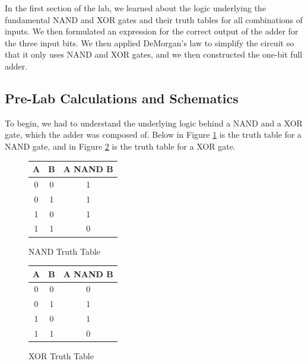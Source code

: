 \documentclass[10pt]{article}
\begin{document}
In the first section of the lab, we learned about the logic underlying the fundamental NAND and XOR gates and their truth tables for all combinations of inputs. We then formulated an expression for the correct output of the adder for the three input bits. We then applied DeMorgan's law to simplify the circuit so that it only uses NAND and XOR gates, and we then constructed the one-bit full adder. 

\medskip


\subsection{Pre-Lab Calculations and Schematics}
To begin, we had to understand the underlying logic behind a NAND and a XOR gate, which the adder was composed of. Below in Figure \ref{NAND} is the truth table for a NAND gate, and in Figure \ref{XOR} is the truth table for a XOR gate. 

\begin{figure} [H]
	\begin{table}[H]
		\centering
		\begin{tabular}{||c c c||} 
			\hline
			A & B &  A NAND B\\ [0.5ex] 
			\hline\hline
			0 & 0 & 1\\ 
			0 & 1 & 1\\
			1 & 0 & 1\\
			1 & 1 & 0\\ [1ex] 
			\hline
		\end{tabular}
	\end{table}
	\caption{NAND Truth Table}
	\label{NAND}
\end{figure}

\begin{figure} [H]
	\begin{table}[H]
		\centering
		\begin{tabular}{||c c c||} 
			\hline
			A & B &  A NAND B\\ [0.5ex] 
			\hline\hline
			0 & 0 & 0\\ 
			0 & 1 & 1\\
			1 & 0 & 1\\
			1 & 1 & 0\\ [1ex] 
			\hline
		\end{tabular}
	\end{table}
	\caption{XOR Truth Table}
	\label{XOR}
\end{figure}
\end{document}
